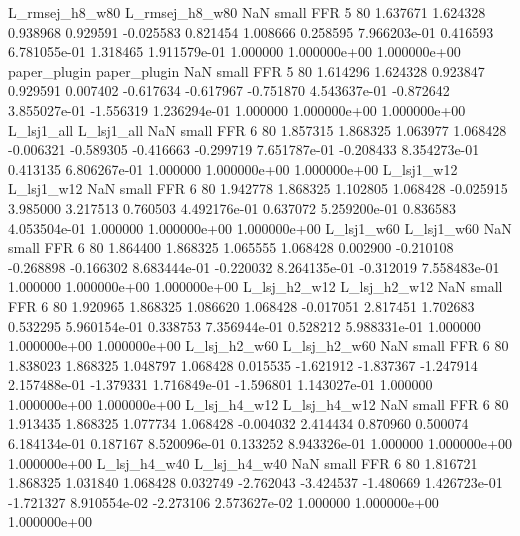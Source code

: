 L_rmsej_h8_w80 L_rmsej_h8_w80                   NaN      small      FFR                 5 80 1.637671       1.624328 0.938968       0.929591   -0.025583      0.821454      1.008666     0.258595   7.966203e-01  0.416593 6.781055e-01     1.318465   1.911579e-01            1.000000    1.000000e+00        1.000000e+00
  paper_plugin   paper_plugin                   NaN      small      FFR                 5 80 1.614296       1.624328 0.923847       0.929591    0.007402     -0.617634     -0.617967    -0.751870   4.543637e-01 -0.872642 3.855027e-01    -1.556319   1.236294e-01            1.000000    1.000000e+00        1.000000e+00
    L_lsj1_all     L_lsj1_all                   NaN      small      FFR                 6 80 1.857315       1.868325 1.063977       1.068428   -0.006321     -0.589305     -0.416663    -0.299719   7.651787e-01 -0.208433 8.354273e-01     0.413135   6.806267e-01            1.000000    1.000000e+00        1.000000e+00
    L_lsj1_w12     L_lsj1_w12                   NaN      small      FFR                 6 80 1.942778       1.868325 1.102805       1.068428   -0.025915      3.985000      3.217513     0.760503   4.492176e-01  0.637072 5.259200e-01     0.836583   4.053504e-01            1.000000    1.000000e+00        1.000000e+00
    L_lsj1_w60     L_lsj1_w60                   NaN      small      FFR                 6 80 1.864400       1.868325 1.065555       1.068428    0.002900     -0.210108     -0.268898    -0.166302   8.683444e-01 -0.220032 8.264135e-01    -0.312019   7.558483e-01            1.000000    1.000000e+00        1.000000e+00
  L_lsj_h2_w12   L_lsj_h2_w12                   NaN      small      FFR                 6 80 1.920965       1.868325 1.086620       1.068428   -0.017051      2.817451      1.702683     0.532295   5.960154e-01  0.338753 7.356944e-01     0.528212   5.988331e-01            1.000000    1.000000e+00        1.000000e+00
  L_lsj_h2_w60   L_lsj_h2_w60                   NaN      small      FFR                 6 80 1.838023       1.868325 1.048797       1.068428    0.015535     -1.621912     -1.837367    -1.247914   2.157488e-01 -1.379331 1.716849e-01    -1.596801   1.143027e-01            1.000000    1.000000e+00        1.000000e+00
  L_lsj_h4_w12   L_lsj_h4_w12                   NaN      small      FFR                 6 80 1.913435       1.868325 1.077734       1.068428   -0.004032      2.414434      0.870960     0.500074   6.184134e-01  0.187167 8.520096e-01     0.133252   8.943326e-01            1.000000    1.000000e+00        1.000000e+00
  L_lsj_h4_w40   L_lsj_h4_w40                   NaN      small      FFR                 6 80 1.816721       1.868325 1.031840       1.068428    0.032749     -2.762043     -3.424537    -1.480669   1.426723e-01 -1.721327 8.910554e-02    -2.273106   2.573627e-02            1.000000    1.000000e+00        1.000000e+00
